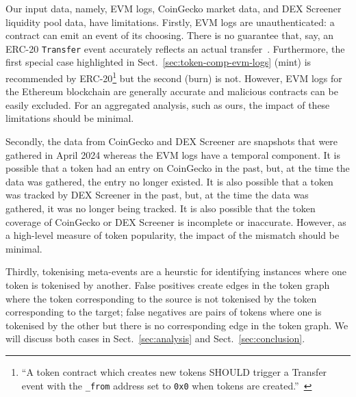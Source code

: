 Our input data, namely, EVM logs, CoinGecko market data, and DEX
Screener liquidity pool data, have limitations.  Firstly, EVM logs are
unauthenticated: a contract can emit an event of its choosing.  There
is no guarantee that, say, an ERC-20 \texttt{Transfer} event
accurately reflects an actual transfer~\cite{guidi-michienzi-22}.
Furthermore, the first special case highlighted in
Sect.~\ref{sec:token-comp-evm-logs} (mint) is recommended by
ERC-20\footnote{``A token contract which creates new tokens SHOULD
trigger a Transfer event with the \texttt{\_from} address set to
\texttt{0x0} when tokens are
created.''~\cite{vogelsteller-buterin-15}} but the second (burn) is
not.  However, EVM logs for the Ethereum blockchain are generally
accurate and malicious contracts can be easily excluded.  For an
aggregated analysis, such as ours, the impact of these limitations
should be minimal.

Secondly, the data from CoinGecko and DEX Screener are snapshots that
were gathered in April 2024 whereas the EVM logs have a temporal
component.  It is possible that a token had an entry on CoinGecko in
the past, but, at the time the data was gathered, the entry no longer
existed.  It is also possible that a token was tracked by DEX Screener
in the past, but, at the time the data was gathered, it was no longer
being tracked.  It is also possible that the token coverage of
CoinGecko or DEX Screener is incomplete or inaccurate.  However, as a
high-level measure of token popularity, the impact of the mismatch
should be minimal.

Thirdly, tokenising meta-events are a heurstic for identifying
instances where one token is tokenised by another.  False positives
create edges in the token graph where the token corresponding to the
source is not tokenised by the token corresponding to the target;
false negatives are pairs of tokens where one is tokenised by the
other but there is no corresponding edge in the token graph.  We will
discuss both cases in Sect.~\ref{sec:analysis} and
Sect.~\ref{sec:conclusion}.
